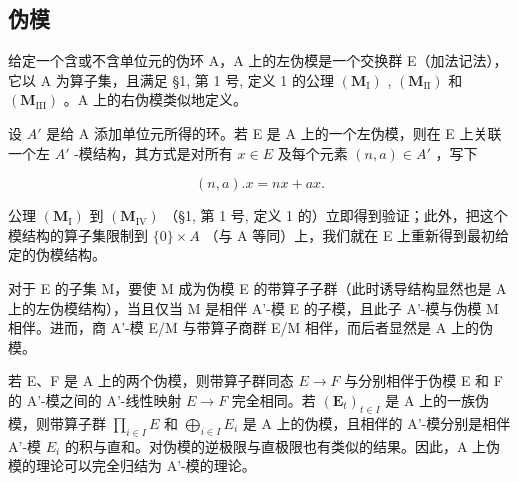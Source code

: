 \subsection{伪模}

给定一个含或不含单位元的伪环 A，A 上的左伪模是一个交换群 E（加法记法），它以 A 为算子集，且满足 §1, 第 1 号, 定义 1 的公理 \((\mathbf{M}_{\mathrm{I}})\) , \((\mathbf{M}_{\mathrm{II}})\) 和 \((\mathbf{M}_{\mathrm{III}})\) 。A 上的右伪模类似地定义。

设 \(A'\) 是给 A 添加单位元所得的环。若 E 是 A 上的一个左伪模，则在 E 上关联一个左 \(A'\) -模结构，其方式是对所有 \(x \in E\) 及每个元素 \((n, a) \in A'\) ，写下

\[
(n, a). x = n x + a x.\tag{2}
\]

公理 \((\mathbf{M}_{\mathrm{I}})\) 到 \((\mathbf{M}_{\mathrm{IV}})\) （§1, 第 1 号, 定义 1 的）立即得到验证；此外，把这个模结构的算子集限制到 \(\{0\} \times A\) （与 A 等同）上，我们就在 E 上重新得到最初给定的伪模结构。

对于 E 的子集 M，要使 M 成为伪模 E 的带算子子群（此时诱导结构显然也是 A 上的左伪模结构），当且仅当 M 是相伴 A'-模 E 的子模，且此子 A'-模与伪模 M 相伴。进而，商 A'-模 E/M 与带算子商群 E/M 相伴，而后者显然是 A 上的伪模。

若 E、F 是 A 上的两个伪模，则带算子群同态 \(E \rightarrow F\) 与分别相伴于伪模 E 和 F 的 A'-模之间的 A'-线性映射 \(E \rightarrow F\) 完全相同。若 \((\mathbf{E}_{t})_{t \in I}\) 是 A 上的一族伪模，则带算子群 \(\prod_{i\in I}E\) 和 \(\bigoplus_{i\in I}E_{i}\) 是 A 上的伪模，且相伴的 A'-模分别是相伴 A'-模 \(E_{i}\) 的积与直和。对伪模的逆极限与直极限也有类似的结果。因此，A 上伪模的理论可以完全归结为 A'-模的理论。


